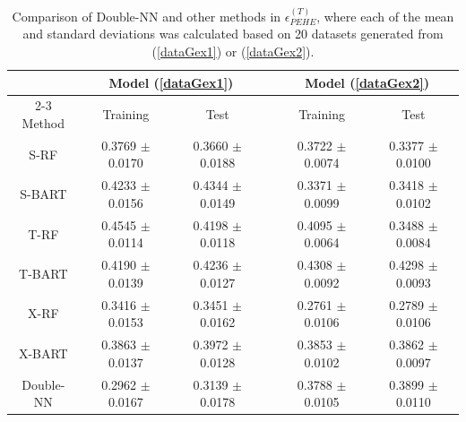 \documentclass[11pt]{article}
\newcommand{\bw}{{\boldsymbol w}}
\begin{document}
\begin{table}[!h]
\caption{Comparison of Double-NN and other methods in $\epsilon_{PEHE}^{(T)}$, 
where each of the mean and standard deviations  was calculated based on 20 
datasets generated from  (\ref{dataGex1}) or   (\ref{dataGex2}).}
\label{tab:PEHE}
\vspace{-0.15in}
\begin{center}
\begin{tabular}{cccccc} \toprule
   &\multicolumn{2}{c}{Model (\ref{dataGex1})} &  &\multicolumn{2}{c}{Model (\ref{dataGex2})} \\ \cline{2-3}  \cline{5-6} 
  Method  & Training & Test & & Training & Test\\ 
  \midrule
 S-RF  &     0.3769 $\pm$ 0.0170  & 0.3660 $\pm$ 0.0188    &&  0.3722 $\pm$ 0.0074    & 0.3377 $\pm$ 0.0100\\ 
 S-BART  & 0.4233 $\pm$ 0.0156 &   0.4344 $\pm$ 0.0149   &&   0.3371 $\pm$ 0.0099 &   0.3418 $\pm$ 0.0102 \\ 
\midrule 
 T-RF  &  0.4545 $\pm$ 0.0114  &  0.4198 $\pm$ 0.0118     &&  0.4095 $\pm$ 0.0064    &  0.3488 $\pm$ 0.0084\\ 
 T-BART  & 0.4190 $\pm$ 0.0139   &  0.4236 $\pm$ 0.0127    &&   0.4308 $\pm$ 0.0092  &    0.4298 $\pm$ 0.0093 \\ 
\midrule 
 X-RF  &    0.3416 $\pm$ 0.0153   &  0.3451 $\pm$ 0.0162      &&  0.2761 $\pm$ 0.0106 & 0.2789 $\pm$ 0.0106 \\ 
 X-BART  &   0.3863 $\pm$ 0.0137  &   0.3972 $\pm$ 0.0128  & &   0.3853 $\pm$ 0.0102 & 0.3862 $\pm$ 0.0097  \\ 
 \midrule 
 Double-NN  & 0.2962 $\pm$ 0.0167 & 0.3139 $\pm$ 0.0178 & & 0.3788 $\pm$  0.0105 & 0.3899 $\pm$  0.0110\\ 
\bottomrule
\end{tabular}
\end{center}
\vspace{-0.1in}
\end{table}




 
\end{document}

